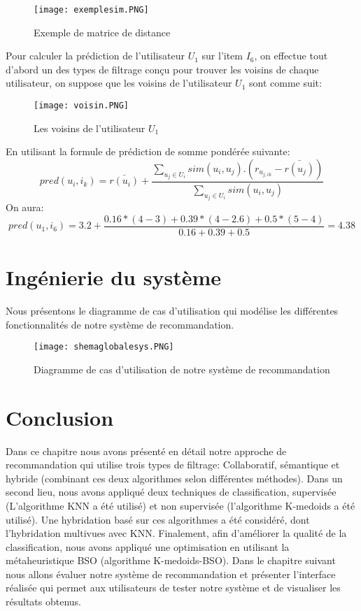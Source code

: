 \begin{figure}[H]
	\centering
	\texttt{[image: exemplesim.PNG]}
	\caption{Exemple de matrice de distance}
	\label{fig:sim}
\end{figure}

Pour calculer la prédiction de l'utilisateur $U_{1}$ sur l'item $I_{6}$, on effectue tout d'abord un des types de filtrage conçu pour trouver les voisins de chaque utilisateur, on suppose que les voisins de l'utilisateur $U_{1}$ sont comme suit:
 
\begin{figure}[H]
	\centering
	\texttt{[image: voisin.PNG]}
	\caption{Les voisins de l'utilisateur $U_{1}$}
	\label{fig:voisin}
\end{figure}
En utilisant la formule de prédiction de somme pondérée suivante:
\begin{equation}
pred(u_{i},i_{k})=\bar{r(u_{i})} + \frac{\sum_{u_{j} \in U_{i}} sim(u_{i},u_{j}).(r_{u_{j,ik}}-\bar{r(u_{j})})}{\sum_{u_{j} \in U_{i}} sim(u_{i},u_{j})}
\end{equation}
On aura:
\begin{equation}
pred(u_{1},i_{6})=	3.2 + \frac{0.16 * (4-3) + 0.39 * (4-2.6) + 0.5 * ( 5-4)}{ 0.16 + 0.39 + 0.5}= 4.38
\end{equation}
\section {Ingénierie du système}
Nous présentons le diagramme de cas d'utilisation qui modélise les différentes fonctionnalités de notre système de recommandation.
\begin{figure}[H]
	
	\centering
	\hspace*{-0.85in}
	\texttt{[image: shemaglobalesys.PNG]}
	
	\caption{Diagramme de cas d'utilisation de notre système de recommandation}
	
	\label{fig:shemaglobalesys}
	
\end{figure}
\section {Conclusion}
Dans ce chapitre nous avons présenté en détail notre approche de recommandation qui utilise trois types de filtrage: Collaboratif, sémantique et hybride (combinant ces deux algorithmes selon différentes méthodes). Dans un second lieu, nous avons appliqué deux techniques de classification, supervisée (L'algorithme KNN a été utilisé) et non supervisée (l'algorithme K-medoids a été utilisé). Une hybridation basé sur ces algorithmes a été considéré, dont l'hybridation multivues avec KNN. Finalement, afin d'améliorer la qualité de la classification, nous avons appliqué une optimisation en utilisant la métaheuristique BSO (algorithme K-medoids-BSO). 
Dans le chapitre suivant nous allons évaluer notre système de recommandation et présenter l'interface réalisée qui permet aux utilisateurs de tester notre système et de visualiser les résultats obtenus.


